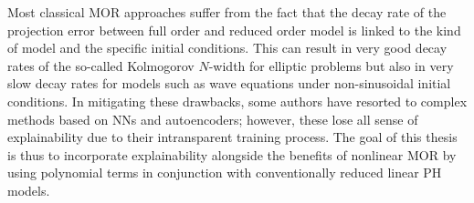 Most classical \acl{MOR} approaches suffer from the fact that the decay rate of the projection error between full order and reduced order model is linked to the kind of model and the specific initial conditions.
This can result in very good decay rates of the so-called Kolmogorov $N$-width for elliptic problems but also in very slow decay rates for models such as wave equations under non-sinusoidal initial conditions.
In mitigating these drawbacks, some authors have resorted to complex methods based on \aclp{NN} and autoencoders; however, these lose all sense of explainability due to their intransparent training process.
The goal of this thesis is thus to incorporate explainability alongside the benefits of nonlinear \acl{MOR} by using polynomial terms in conjunction with conventionally reduced linear \acl{PH} models.
